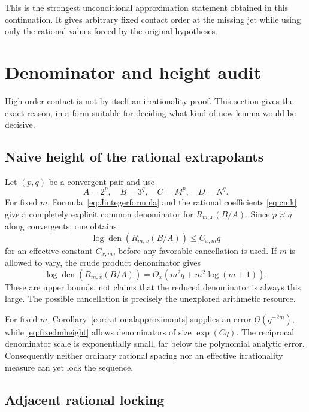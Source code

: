 \documentclass[11pt,oneside]{article}
\theoremstyle{definition}
\theoremstyle{remark}
\newcommand{\den}{\operatorname{den}}
\begin{document}
This is the strongest unconditional approximation statement obtained in this continuation.
It gives arbitrary fixed contact order at the missing jet while using only the rational values
forced by the original hypotheses.

\section{Denominator and height audit}
\label{sec:denaudit}

High-order contact is not by itself an irrationality proof.  This section gives the exact
reason, in a form suitable for deciding what kind of new lemma would be decisive.

\subsection{Naive height of the rational extrapolants}

Let $(p,q)$ be a convergent pair and use
\[
 A=2^p,
 \quad B=3^q,
 \quad C=M^p,
 \quad D=N^q.
\]
For fixed $m$, Formula~\eqref{eq:Jintegerformula} and the rational coefficients
\eqref{eq:cmk} give a completely explicit common denominator for
$R_{m,x}(B/A)$.  Since $p\asymp q$ along convergents, one obtains
\begin{equation}
 \log \den\!\left(R_{m,x}(B/A)\right)
 \le C_{x,m}q
 \label{eq:fixedmheight}
\end{equation}
for an effective constant $C_{x,m}$, before any favorable cancellation is used.  If $m$ is
allowed to vary, the crude product denominator gives
\begin{equation}
 \log \den\!\left(R_{m,x}(B/A)\right)
 =O_x(m^2q+m^2\log(m+1)).
 \label{eq:variablemheight}
\end{equation}
These are upper bounds, not claims that the reduced denominator is always this large.  The
possible cancellation is precisely the unexplored arithmetic resource.

For fixed $m$, Corollary~\ref{cor:rationalapproximants} supplies an error $O(q^{-2m})$, while
\eqref{eq:fixedmheight} allows denominators of size $\exp(Cq)$.  The reciprocal denominator
scale is exponentially small, far below the polynomial analytic error.  Consequently neither
ordinary rational spacing nor an effective irrationality measure can yet lock the sequence.

\subsection{Adjacent rational locking}
\end{document}
